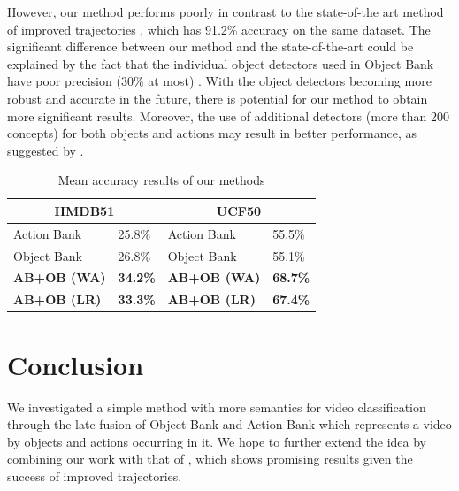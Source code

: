 \documentclass[MIRU]{miru2015e}
\begin{document}
However, our method performs poorly in contrast to the state-of-the art method of improved trajectories \cite{wang}, which has 91.2\% accuracy on the same dataset. The significant difference between our method and the state-of-the-art could be explained by the fact that the individual object detectors used in Object Bank have poor precision (30\% at most) \cite{obdimreduce}. With the object detectors becoming more robust and accurate in the future, there is potential for our method to obtain more significant results. Moreover, the use of additional detectors (more than 200 concepts) for both objects and actions may result in better performance, as suggested by \cite{recommendation}.

\begin{table}[h]
\centering
\caption{Mean accuracy results of our methods}
\begin{tabular}{|ll|ll|}
\hline
\multicolumn{2}{|c|}{HMDB51} & \multicolumn{2}{c|}{UCF50}  \\ \hline
Action Bank          & 25.8\%          & Action Bank         & 55.5\%          \\
Object Bank          & 26.8\%          & Object Bank         & 55.1\%          \\ \hline
\textbf{AB+OB (WA)}  & \textbf{34.2\%} & \textbf{AB+OB (WA)} & \textbf{68.7\%} \\
\textbf{AB+OB (LR)}  & \textbf{33.3\%} & \textbf{AB+OB (LR)} & \textbf{67.4\%} \\ \hline
\end{tabular}
\end{table}

\section{Conclusion}
We investigated a simple method with more semantics for video classification through the late fusion of Object Bank and Action Bank which represents a video by objects and actions occurring in it. We hope to further extend the idea by combining our work with that of \cite{wang}, which shows promising results given the success of improved trajectories.
%
%



\end{document}
